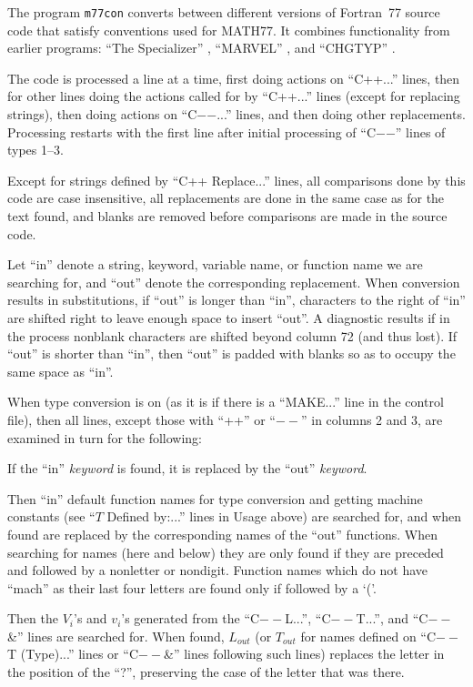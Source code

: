 \documentclass[twoside]{MATH77}
\begin{document}
The program {\tt m77con} converts between different versions of Fortran~77
source code that satisfy conventions used for MATH77.  It combines
functionality from earlier programs: ``The Specializer''
\cite{Krogh:1974:ALS}, ``MARVEL'' \cite{Lawson:1980:MAR}, and ``CHGTYP''
\cite{Lawson:1988:CHG}.

The code is processed a line at a time, first doing actions on
``C++...'' lines, then for other lines doing the actions called for
by ``C++...'' lines (except for replacing strings), then doing
actions on ``C$-$$-$...'' lines, and then doing other replacements.
Processing restarts with the first line after initial processing of
``C$-$$-$'' lines of types 1--3.

Except for strings defined by ``C++ Replace...'' lines, all
comparisons done by this code are case insensitive, all replacements
are done in the same case as for the text found, and blanks are
removed before comparisons are made in the source code.

Let ``in'' denote a string, keyword, variable name, or function name
we are searching for, and ``out'' denote the corresponding
replacement.  When conversion results in substitutions, if ``out'' is
longer than ``in'', characters to the right of ``in'' are shifted
right to leave enough space to insert ``out''.  A diagnostic
results if in the process nonblank characters are shifted beyond
column 72 (and thus lost).  If ``out'' is shorter than ``in'', then
``out'' is padded with blanks so as to occupy the same space as
``in''.

When type conversion is on (as it is if there is a ``MAKE...'' line
in the control file), then all lines, except those with ``++'' or
``$--$'' in columns 2 and 3, are examined in turn for the following:

If the ``in'' {\em keyword} is found, it is replaced by the ``out''
{\em keyword}.

Then ``in'' default function names for type conversion and getting
machine constants (see ``$T$ Defined by:...'' lines in Usage above)
are searched for, and when found are replaced by the corresponding
names of the ``out'' functions.  When searching for names (here and
below) they are only found if they are preceded and followed by a
nonletter or nondigit. Function names which do not have ``mach'' as
their last four letters are found only if followed by a `('.

Then the $V_i$'s and $v_i$'s generated from the ``C$--$L...'',
``C$--$T...'', and ``C$--$\&'' lines are searched for.  When found,
$L_{out}$ (or $T_{out}$ for names defined on ``C$--$T (Type)...''
lines or ``C$--$\&'' lines following such lines) replaces the letter
in the position of the ``?'', preserving the case of the letter that
was there.
\end{document}
